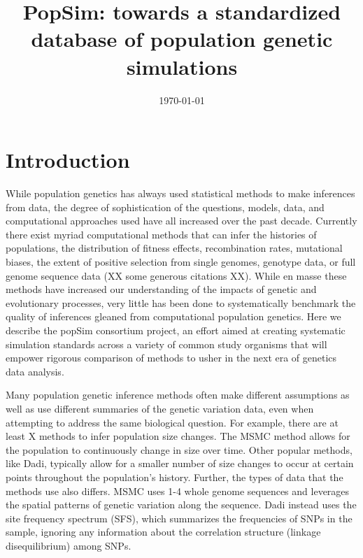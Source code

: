 \documentclass[12pt,halfline,a4paper]{ouparticle}
\begin{document}
\title{PopSim: towards a standardized database of population genetic simulations}

\author{%
\address{}
\email{}}



\date{\today}


\maketitle


\section*{Introduction}
While population genetics has always used statistical methods to make inferences from data,
the degree of sophistication of the questions, models, data, and computational approaches
used have all increased over the past decade. Currently there exist myriad computational methods
that can infer the histories of populations, the distribution of fitness effects,
recombination rates, mutational biases, the extent of positive selection from single genomes,
genotype data, or full genome sequence data (XX some generous citations XX).
While en masse these methods have increased our understanding of the
impacts of genetic and evolutionary processes, very little has been done to systematically
benchmark the quality of inferences gleaned from computational population genetics. Here we
describe the popSim consortium project, an effort aimed at creating systematic simulation
standards across a variety of common study organisms that will empower rigorous comparison
of methods to usher in the next era of genetics data analysis.

Many population genetic inference methods often make different assumptions as
well as use different summaries of the genetic variation data, even when
attempting to address the same biological question. For example, there are at
least X methods to infer population size changes. The MSMC method allows for the
population to continuously change in size over time. Other popular methods, like
Dadi, typically allow for a smaller number of size changes to occur at certain
points throughout the population's history. Further, the types of data that the
methods use also differs. MSMC uses 1-4 whole genome sequences and leverages the
spatial patterns of genetic variation along the sequence. Dadi instead uses the
site frequency spectrum (SFS), which summarizes the frequencies of SNPs in the
sample, ignoring any information about the correlation structure (linkage
disequilibrium) among SNPs.
\end{document}

